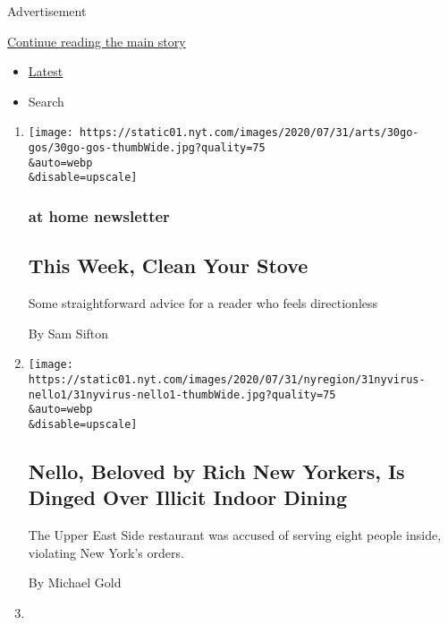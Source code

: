 Advertisement

\protect\hyperlink{after-mid1}{Continue reading the main story}

\begin{itemize}
\tightlist
\item
  \protect\hyperlink{stream-panel}{Latest}
\item
  Search
\end{itemize}

\begin{enumerate}
\def\labelenumi{\arabic{enumi}.}
\item
  \href{/2020/07/31/at-home/newsletter.html}{}

  \texttt{[image: https://static01.nyt.com/images/2020/07/31/arts/30go-gos/30go-gos-thumbWide.jpg?quality=75\\\&auto=webp\\\&disable=upscale]}

  \hypertarget{at-home-newsletter}{%
  \subsubsection{at home newsletter}\label{at-home-newsletter}}

  \hypertarget{this-week-clean-your-stove}{%
  \subsection{This Week, Clean Your
  Stove}\label{this-week-clean-your-stove}}

  Some straightforward advice for a reader who feels directionless

  By Sam Sifton
\item
  \href{/2020/07/31/nyregion/nello-liquor-license-suspended.html}{}

  \texttt{[image: https://static01.nyt.com/images/2020/07/31/nyregion/31nyvirus-nello1/31nyvirus-nello1-thumbWide.jpg?quality=75\\\&auto=webp\\\&disable=upscale]}

  \hypertarget{nello-beloved-by-rich-new-yorkers-is-dinged-over-illicit-indoor-dining}{%
  \subsection{Nello, Beloved by Rich New Yorkers, Is Dinged Over Illicit
  Indoor
  Dining}\label{nello-beloved-by-rich-new-yorkers-is-dinged-over-illicit-indoor-dining}}

  The Upper East Side restaurant was accused of serving eight people
  inside, violating New York's orders.

  By Michael Gold
\item
  \href{/2020/07/31/dining/low-key-cooking.html}{}


\end{enumerate}
